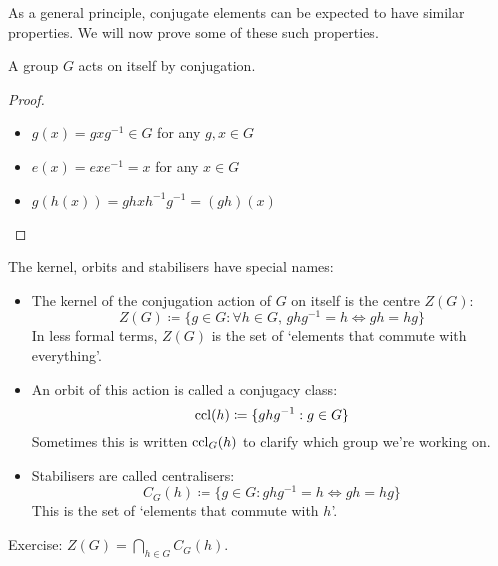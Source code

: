 As a general principle, conjugate elements can be expected to have similar properties.
We will now prove some of these such properties.
\begin{proposition}
	A group \(G\) acts on itself by conjugation.
\end{proposition}
\begin{proof}
	\begin{itemize}
		\item \(g(x) = gxg^{-1} \in G\) for any \(g, x \in G\)
		\item \(e(x) = exe^{-1} = x\) for any \(x \in G\)
		\item \(g(h(x)) = ghxh^{-1}g^{-1} = (gh)(x)\)
	\end{itemize}
\end{proof}
\begin{definition}
	The kernel, orbits and stabilisers have special names:
	\begin{itemize}
		\item The kernel of the conjugation action of \(G\) on itself is the centre \(Z(G)\):
		      \[
			      Z(G) \coloneq \{ g \in G : \forall h \in G,\, ghg^{-1} = h \iff gh=hg \}
		      \]
		      In less formal terms, \(Z(G)\) is the set of `elements that commute with everything'.
		\item An orbit of this action is called a conjugacy class:
		      \[
			      \operatorname{ccl}(h) \coloneq \{ ghg^{-1}: g \in G \}
		      \]
		      Sometimes this is written \(\operatorname{ccl}_G(h)\) to clarify which group we're working on.
		\item Stabilisers are called centralisers:
		      \[
			      C_G(h) \coloneq \{ g \in G : ghg^{-1} = h \iff gh = hg \}
		      \]
		      This is the set of `elements that commute with \(h\)'.
	\end{itemize}
\end{definition}
Exercise: \(Z(G) = \bigcap_{h \in G} C_G(h)\).

